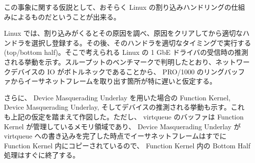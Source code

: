 \documentclass[a4paper,11pt,report]{ltjsbook}
\begin{document}
この事象に関する仮説として、おそらく Linux の割り込みハンドリングの仕組みによるものだということが出来る。

Linux では、割り込みがくるとその原因を調べ、原因をクリアしてから適切なハンドラを選択し登録する。その後、そのハンドラを適切なタイミングで実行する(top/bottom half)。そこで考えられる Linux の 1 GbE ドライバの受信時の推測される挙動を示す。スループットのベンチマークで判明したとおり、ネットワークデバイスの IO がボトルネックであることから、 PRO/1000 のリングバッファからイーサネットフレームを取り出す箇所が特に遅いと仮定する。

さらに、 Device Masquerading Underlay を用いた場合の Function Kernel, Device Masquerading Underlay, そしてデバイスの推測される挙動も示す。これも上記の仮定を踏まえて作図した。ただし、 virtqueue のバッファは Function Kernel が管理しているメモリ領域であり、 Device Masquerading Underlay が virtqueue への書き込みを完了した時点でイーサネットフレームはすでに Function Kernel 内にコピーされているので、 Function Kernel 内の Bottom Half 処理はすぐに終了する。
\end{document}
